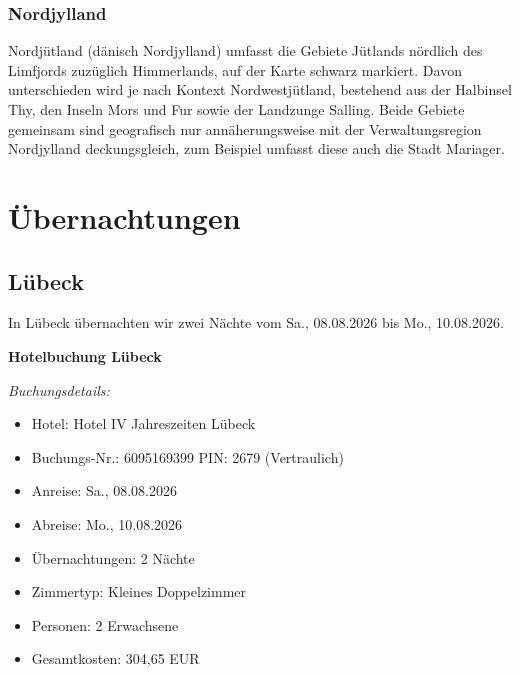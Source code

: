 \documentclass[a4paper,12pt]{article}
\begin{document}
\subsubsection{Nordjylland}

Nordjütland (dänisch Nordjylland) umfasst die Gebiete Jütlands nördlich des Limfjords zuzüglich Himmerlands, auf der Karte schwarz markiert. Davon unterschieden wird je nach Kontext Nordwestjütland, bestehend aus der Halbinsel Thy, den Inseln Mors und Fur sowie der Landzunge Salling. Beide Gebiete gemeinsam sind geografisch nur annäherungsweise mit der Verwaltungsregion Nordjylland deckungsgleich, zum Beispiel umfasst diese auch die Stadt Mariager.

\section{Übernachtungen}

\subsection{Lübeck}

In Lübeck übernachten wir zwei Nächte vom Sa., 08.08.2026 bis Mo., 10.08.2026.

\textbf{Hotelbuchung Lübeck}

\textit{Buchungsdetails:}
\begin{itemize}
\item Hotel: Hotel IV Jahreszeiten Lübeck
\item Buchungs-Nr.: 6095169399 PIN: 2679 (Vertraulich)
\item Anreise: Sa., 08.08.2026
\item Abreise: Mo., 10.08.2026
\item Übernachtungen: 2 Nächte
\item Zimmertyp: Kleines Doppelzimmer
\item Personen: 2 Erwachsene
\item Gesamtkosten: 304,65 EUR
\end{itemize}
\end{document}
